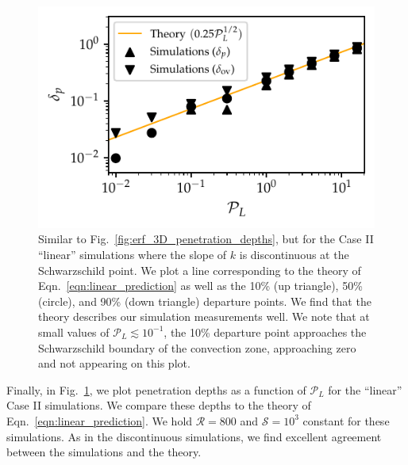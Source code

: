 \documentclass{aastex631}
\newcommand{\mP}{\ensuremath{\mathcal{P}}}
\newcommand{\mR}{\ensuremath{\mathcal{R}}}
\newcommand{\mS}{\ensuremath{\mathcal{S}}}
\begin{document}
\begin{figure}[t!]
\centering
\includegraphics{linear_3D_penetration_depths.pdf}
\caption{
Similar to Fig.~\ref{fig:erf_3D_penetration_depths}, but for the Case II ``linear'' simulations where the slope of $k$ is discontinuous at the Schwarzschild point.
We plot a line corresponding to the theory of Eqn.~\ref{eqn:linear_prediction} as well as the 10\% (up triangle), 50\% (circle), and 90\% (down triangle) departure points.
We find that the theory describes our simulation measurements well.
We note that at small values of $\mP_L \lesssim 10^{-1}$, the 10\% departure point approaches the Schwarzschild boundary of the convection zone, approaching zero and not appearing on this plot.
\label{fig:linear_3D_penetration_depths}
}
\end{figure}

Finally, in Fig.~\ref{fig:linear_3D_penetration_depths}, we plot penetration depths as a function of $\mP_L$ for the ``linear'' Case II simulations.
We compare these depths to the theory of Eqn.~\ref{eqn:linear_prediction}.
We hold $\mR = 800$ and $\mS = 10^3$ constant for these simulations.
As in the discontinuous simulations, we find excellent agreement between the simulations and the theory.
\end{document}

